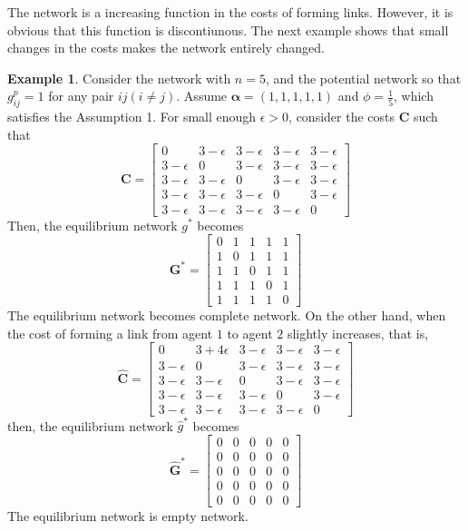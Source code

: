 \documentclass[12pt]{article}
\theoremstyle{definition}
\newtheorem{example}{Example}
\begin{document}
The network is a increasing function in the costs of forming links.
However, it is obvious that this function is discontiunous.
The next example shows that small changes in the costs makes the network entirely changed.

\begin{example}
Consider the network with $n = 5$, and the potential network so that $g_{ij}^p = 1$ for any pair $ij(i \neq j)$.
Assume $\bm{\alpha} = (1, 1, 1, 1, 1)$ and $\phi = \frac{1}{5}$, which satisfies the Assumption 1.
For small enough $\epsilon > 0$, consider the costs $\bm{C}$ such that
\[ \bm{C} = \left[
			\begin{array}{ccccc}
				0 & 3 - \epsilon & 3 - \epsilon & 3 - \epsilon & 3 - \epsilon \\
				3 - \epsilon & 0 & 3 - \epsilon & 3 - \epsilon & 3 - \epsilon \\
				3 - \epsilon & 3 - \epsilon & 0 & 3 - \epsilon & 3 - \epsilon \\
				3 - \epsilon & 3 - \epsilon & 3 - \epsilon & 0 & 3 - \epsilon \\
				3 - \epsilon & 3 - \epsilon & 3 - \epsilon & 3 - \epsilon & 0
			\end{array} \right] \]
Then, the equilibrium network $g^*$ becomes
\[\bm{G}^* = \left[
			\begin{array}{ccccc}
				0 & 1 & 1 & 1 & 1 \\
				1 & 0 & 1 & 1 & 1 \\
				1 & 1 & 0 & 1 & 1 \\
				1 & 1 & 1 & 0 & 1 \\
				1 & 1 & 1 & 1 & 0
			\end{array} \right] \]
The equilibrium network becomes complete network.
On the other hand, when the cost of forming a link from agent $1$ to agent $2$ slightly increases, that is,
\[\bm{\hat{C}} = \left[
			\begin{array}{ccccc}
				0 & 3 + 4 \epsilon & 3 - \epsilon & 3 - \epsilon & 3 - \epsilon \\
				3 - \epsilon & 0 & 3 - \epsilon & 3 - \epsilon & 3 - \epsilon \\
				3 - \epsilon & 3 - \epsilon & 0 & 3 - \epsilon & 3 - \epsilon \\
				3 - \epsilon & 3 - \epsilon & 3 - \epsilon & 0 & 3 - \epsilon \\
				3 - \epsilon & 3 - \epsilon & 3 - \epsilon & 3 - \epsilon & 0
			\end{array} \right] \]
then, the equilibrium network $\hat{g}^*$ becomes
\[ \bm{\hat{G}}^* = \left[
			\begin{array}{ccccc}
				0 & 0 & 0 & 0 & 0 \\
				0 & 0 & 0 & 0 & 0 \\
				0 & 0 & 0 & 0 & 0 \\
				0 & 0 & 0 & 0 & 0 \\
				0 & 0 & 0 & 0 & 0
			\end{array} \right] \]
The equilibrium network is empty network.
\end{example}
\end{document}
